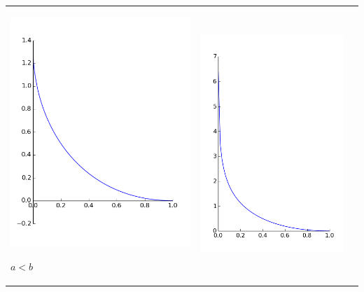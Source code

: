\begin{tabular}{m{4cm} m{4cm} m{4cm}}
\begin{center}
\includegraphics[scale=.3]{imagenes/perse_a_1_b_2.png}

$a<b$
\end{center}
&
\begin{center}
\includegraphics[scale=.3]{imagenes/perse_a_1_b_1.png}


\end{center}
\end{tabular}
